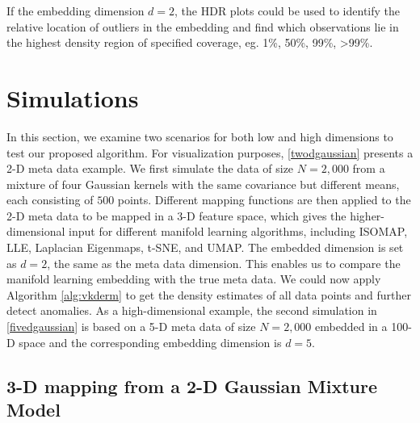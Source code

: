 \documentclass[11pt,a4paper,]{article}
\begin{document}
If the embedding dimension \(d=2\), the HDR plots \autocite{Hyndman1996-lk} could be used to identify the relative location of outliers in the embedding and find which observations lie in the highest density region of specified coverage, eg. 1\%, 50\%, 99\%, \textgreater99\%.

\hypertarget{simulation}{%
\section{Simulations}\label{simulation}}

In this section, we examine two scenarios for both low and high dimensions to test our proposed algorithm. For visualization purposes, \autoref{twodgaussian} presents a 2-D meta data example. We first simulate the data of size \(N=2,000\) from a mixture of four Gaussian kernels with the same covariance but different means, each consisting of \(500\) points. Different mapping functions are then applied to the 2-D meta data to be mapped in a 3-D feature space, which gives the higher-dimensional input for different manifold learning algorithms, including ISOMAP, LLE, Laplacian Eigenmaps, t-SNE, and UMAP. The embedded dimension is set as \(d=2\), the same as the meta data dimension. This enables us to compare the manifold learning embedding with the true meta data. We could now apply Algorithm \ref{alg:vkderm} to get the density estimates of all data points and further detect anomalies. As a high-dimensional example, the second simulation in \autoref{fivedgaussian} is based on a 5-D meta data of size \(N=2,000\) embedded in a 100-D space and the corresponding embedding dimension is \(d=5\).

\hypertarget{twodgaussian}{%
\subsection{3-D mapping from a 2-D Gaussian Mixture Model}\label{twodgaussian}}
\end{document}
